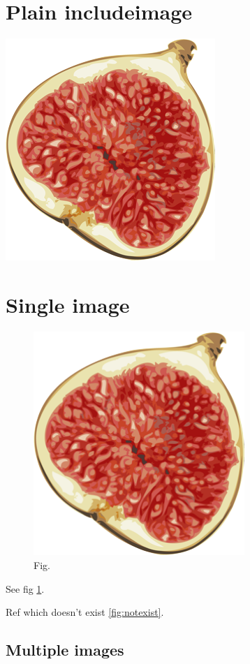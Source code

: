\documentclass{article}
\begin{document}
  \section{Plain includeimage}

  \includegraphics[]{fig.png}

  \section{Single image}

  \begin{figure}[h]
    \includegraphics[width=8cm]{fig.png}
    \caption{Fig.}
    \label{fig:fig}
  \end{figure}
  See fig \ref{fig:fig}.

  Ref which doesn't exist \ref{fig:notexist}.

  \subsection{Multiple images}
\end{document}
